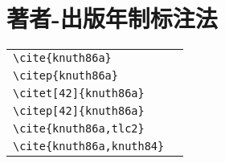 \section{著者-出版年制标注法}

\noindent
\begin{tabular}{l@{\quad$\Rightarrow$\quad}l}
  \verb|\cite{knuth86a}| & \cite{knuth86a}         \\
  \verb|\citep{knuth86a}| & \citep{knuth86a}        \\
  \verb|\citet[42]{knuth86a}| & \citet[42]{knuth86a}    \\
  \verb|\citep[42]{knuth86a}| & \citep[42]{knuth86a}    \\
  \verb|\cite{knuth86a,tlc2}| & \cite{knuth86a,tlc2}    \\
  \verb|\cite{knuth86a,knuth84}| & \cite{knuth86a,knuth84} \\
\end{tabular}


\nocite{*}

